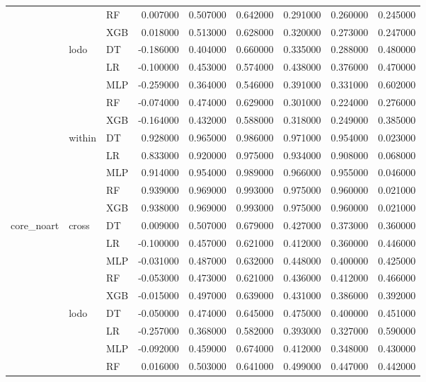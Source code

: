\begin{tabular}{lllrrrrrr}
 &  & RF & 0.007000 & 0.507000 & 0.642000 & 0.291000 & 0.260000 & 0.245000 \\
 &  & XGB & 0.018000 & 0.513000 & 0.628000 & 0.320000 & 0.273000 & 0.247000 \\
\cline{2-9}
 & \multirow[t]{5}{*}{lodo} & DT & -0.186000 & 0.404000 & 0.660000 & 0.335000 & 0.288000 & 0.480000 \\
 &  & LR & -0.100000 & 0.453000 & 0.574000 & 0.438000 & 0.376000 & 0.470000 \\
 &  & MLP & -0.259000 & 0.364000 & 0.546000 & 0.391000 & 0.331000 & 0.602000 \\
 &  & RF & -0.074000 & 0.474000 & 0.629000 & 0.301000 & 0.224000 & 0.276000 \\
 &  & XGB & -0.164000 & 0.432000 & 0.588000 & 0.318000 & 0.249000 & 0.385000 \\
\cline{2-9}
 & \multirow[t]{5}{*}{within} & DT & 0.928000 & 0.965000 & 0.986000 & 0.971000 & 0.954000 & 0.023000 \\
 &  & LR & 0.833000 & 0.920000 & 0.975000 & 0.934000 & 0.908000 & 0.068000 \\
 &  & MLP & 0.914000 & 0.954000 & 0.989000 & 0.966000 & 0.955000 & 0.046000 \\
 &  & RF & 0.939000 & 0.969000 & 0.993000 & 0.975000 & 0.960000 & 0.021000 \\
 &  & XGB & 0.938000 & 0.969000 & 0.993000 & 0.975000 & 0.960000 & 0.021000 \\
\cline{1-9} \cline{2-9}
\multirow[t]{15}{*}{core_noart} & \multirow[t]{5}{*}{cross} & DT & 0.009000 & 0.507000 & 0.679000 & 0.427000 & 0.373000 & 0.360000 \\
 &  & LR & -0.100000 & 0.457000 & 0.621000 & 0.412000 & 0.360000 & 0.446000 \\
 &  & MLP & -0.031000 & 0.487000 & 0.632000 & 0.448000 & 0.400000 & 0.425000 \\
 &  & RF & -0.053000 & 0.473000 & 0.621000 & 0.436000 & 0.412000 & 0.466000 \\
 &  & XGB & -0.015000 & 0.497000 & 0.639000 & 0.431000 & 0.386000 & 0.392000 \\
\cline{2-9}
 & \multirow[t]{5}{*}{lodo} & DT & -0.050000 & 0.474000 & 0.645000 & 0.475000 & 0.400000 & 0.451000 \\
 &  & LR & -0.257000 & 0.368000 & 0.582000 & 0.393000 & 0.327000 & 0.590000 \\
 &  & MLP & -0.092000 & 0.459000 & 0.674000 & 0.412000 & 0.348000 & 0.430000 \\
 &  & RF & 0.016000 & 0.503000 & 0.641000 & 0.499000 & 0.447000 & 0.442000 \\

\end{tabular}
